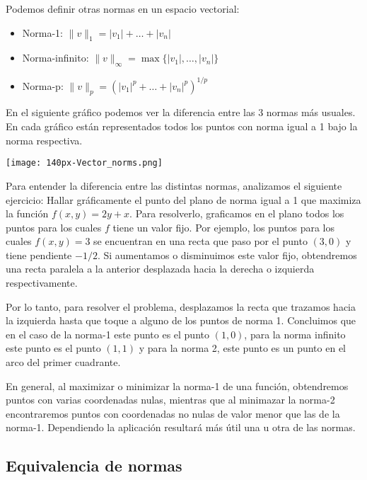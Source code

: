Podemos definir otras normas en un espacio vectorial:

\begin{itemize}
\item Norma-1: $\| v \|_1 = |v_1| + \dots + |v_n|$
\item Norma-infinito: $\| v \|_\infty = \max\{|v_1|, \dots, |v_n|\}$
\item Norma-p: $\| v \|_p = \left(|v_1|^p  + \dots + |v_n|^p \right)^{1/p}$
\end{itemize}

En el siguiente gr\'afico podemos ver la diferencia entre las 3 normas m\'as usuales. En cada gr\'afico est\'an representados todos los puntos con norma igual a 1 bajo la norma respectiva.

\begin{center}
\texttt{[image: 140px-Vector\_norms.png]}
\end{center}

\begin{aplicacion}
Para entender la diferencia entre las distintas normas, analizamos el siguiente ejercicio: Hallar gr\'aficamente el punto del plano de norma igual a 1 que maximiza la funci\'on $f(x,y) = 2y + x$. Para resolverlo, graficamos en el plano todos los puntos para los cuales $f$ tiene un valor fijo. Por ejemplo, los puntos para los cuales $f(x,y) = 3$ se encuentran en una recta que paso por el punto $(3,0)$ y tiene pendiente $-1/2$. Si aumentamos o disminuimos este valor fijo, obtendremos una recta paralela a la anterior desplazada hacia la derecha o izquierda respectivamente.

Por lo tanto, para resolver el problema, desplazamos la recta que trazamos hacia la izquierda hasta que toque a alguno de los puntos de norma 1.
Concluimos que en el caso de la norma-1 este punto es el punto $(1,0)$, para la norma infinito este punto es el punto $(1,1)$ y para la norma 2, este punto es un punto en el arco del primer cuadrante.

En general, al maximizar o minimizar la norma-1 de una función, obtendremos puntos con varias coordenadas nulas, mientras que al minimazar la norma-2 encontraremos puntos con coordenadas no nulas de valor menor que las de la norma-1. Dependiendo la aplicación resultará m\'as \'util una u otra de las normas.
\end{aplicacion}

\subsection{Equivalencia de normas}

